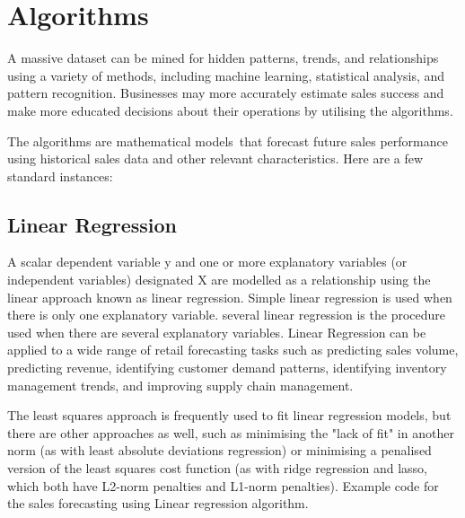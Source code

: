 %
%


\chapter{Algorithms}

A massive dataset can be mined for hidden patterns, trends, and relationships using a variety of methods, including machine learning, statistical analysis, and pattern recognition. Businesses may more accurately estimate sales success and make more educated decisions about their operations by utilising the algorithms.\cite{Cheriyan:2018} \bigskip

The algorithms are mathematical models that forecast future sales performance using historical sales data and other relevant characteristics.\cite{tsoumakas:2019}
Here are a few standard instances:

\section{Linear Regression}

A scalar dependent variable y and one or more explanatory variables (or independent variables) designated X are modelled as a relationship using the linear approach known as linear regression. Simple linear regression is used when there is only one explanatory variable. several linear regression is the procedure used when there are several explanatory variables.
Linear Regression can be applied to a wide range of retail forecasting tasks such as predicting sales volume, predicting revenue, identifying customer demand patterns, identifying inventory management trends, and improving supply chain management. \cite{Cheriyan:2018} \bigskip

The least squares approach is frequently used to fit linear regression models, but there are other approaches as well, such as minimising the "lack of fit" in another norm (as with least absolute deviations regression) or minimising a penalised version of the least squares cost function (as with ridge regression and lasso, which both have L2-norm penalties and L1-norm penalties).
Example code for the sales forecasting using Linear regression algorithm. 

